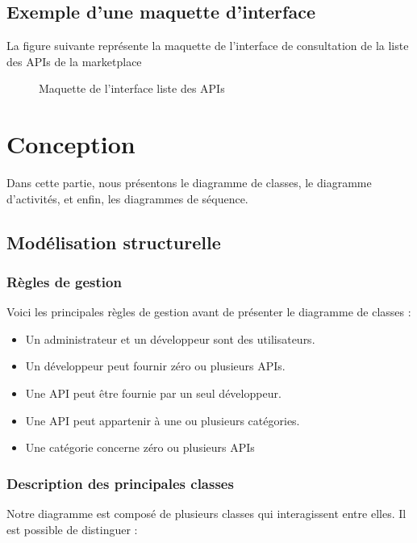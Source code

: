     \subsection{Exemple d’une maquette d’interface}
    La figure suivante représente la maquette de l’interface de consultation de la liste des APIs de la marketplace  
    \begin{figure}[H]
        \centering
        \caption{Maquette de l'interface liste des APIs }
        \label{fig:logo_tt}
    \end{figure}
\pagebreak

\section{Conception}
Dans cette partie, nous présentons le diagramme de classes, le diagramme d'activités, et enfin, les diagrammes de séquence.

    \subsection{Modélisation structurelle}

        \subsubsection{Règles de gestion}
        Voici les principales règles de gestion avant de présenter le diagramme de classes :
        \begin{itemize}
            \item  Un administrateur et un développeur sont des utilisateurs.
            \item Un développeur peut fournir zéro ou plusieurs APIs.
            \item Une API peut être fournie par un seul développeur.
            \item Une API peut appartenir à une ou plusieurs catégories.
            \item Une catégorie concerne zéro ou plusieurs APIs
        \end{itemize}

        \subsubsection{Description des principales classes}
        Notre diagramme est composé de plusieurs classes qui interagissent entre elles. Il est possible de distinguer :

